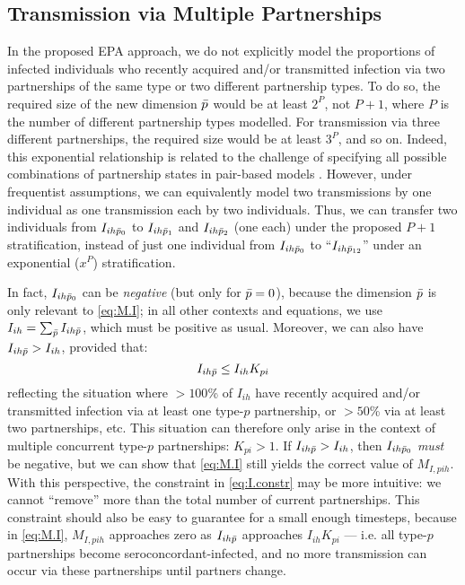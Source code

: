 \subsection{Transmission via Multiple Partnerships}\label{foi.prop.mp}
In the proposed EPA approach,
we do not explicitly model the proportions of infected individuals
who recently acquired and/or transmitted infection via
two partnerships of the same type or two different partnership types.
To do so, the required size of the new dimension $\bar{p}$ would be at least $2^{P}$, not $P+1$,
where $P$ is the number of different partnership types modelled.
For transmission via three different partnerships,
the required size would be at least $3^{P}$, and so on.
Indeed, this exponential relationship is related to the challenge of specifying
all possible combinations of partnership states in pair-based models \cite{Kretzschmar2017}. %
However, under frequentist assumptions, we can equivalently model
two transmissions by one individual as one transmission each by two individuals.
Thus, we can transfer two individuals from $I_{ih\bar{p}_0}$ to
$I_{ih\bar{p}_1}$ and $I_{ih\bar{p}_2}$ (one each) under the proposed $P+1$ stratification,
instead of just one individual from $I_{ih\bar{p}_0}$ to
``$I_{ih\bar{p}_{12}}$'' under an exponential ($x^P$) stratification.
\par
In fact, $I_{ih\bar{p}_0}$ can be \emph{negative} (but only for $\bar{p} = 0$),
because the dimension $\bar{p}$ is only relevant to \eqref{eq:M.I};
in all other contexts and equations,
we use $I_{ih} = \sum_{\bar{p}} I_{ih\bar{p}}$, which must be positive as usual.
Moreover, we can also have $I_{ih\bar{p}} > I_{ih}$, provided that:
\begin{equation}\label{eq:I.constr}
  I_{ih\bar{p}} \le I_{ih} K_{pi}
\end{equation}
reflecting the situation where $>100$\% of $I_{ih}$
have recently acquired and/or transmitted infection via at least one type-$p$ partnership,
or $>50$\% via at least two partnerships, etc.
This situation can therefore only arise in the context of
multiple concurrent type-$p$ partnerships: $K_{pi} > 1$.
If $I_{ih\bar{p}} > I_{ih}$, then $I_{ih\bar{p}_0}$ \emph{must} be negative,
but we can show that \eqref{eq:M.I} still yields the correct value of $M_{I,pih}$.
With this perspective, the constraint in \eqref{eq:I.constr} may be more intuitive:
we cannot ``remove'' more than the total number of current partnerships.
This constraint should also be easy to guarantee for a small enough timesteps,
because in \eqref{eq:M.I}, $M_{I,pih}$ approaches zero as $I_{ih\bar{p}}$ approaches $I_{ih} K_{pi}$
--- i.e. all type-$p$ partnerships become seroconcordant-infected,
and no more transmission can occur via these partnerships until partners change.
